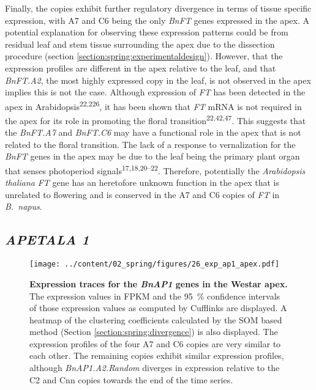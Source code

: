 \documentclass[12pt,]{book}
\begin{document}
Finally, the copies exhibit further regulatory divergence in terms of
tissue specific expression, with A7 and C6 being the only \emph{BnFT}
genes expressed in the apex. A potential explanation for observing these
expression patterns could be from residual leaf and stem tissue
surrounding the apex due to the dissection procedure (section
\ref{section:spring:experimentaldesign}). However, that the expression
profiles are different in the apex relative to the leaf, and that
\emph{BnFT.A2}, the most highly expressed copy in the leaf, is not
observed in the apex implies this is not the case. Although expression
of \emph{FT} has been detected in the apex in
Arabidopsis\textsuperscript{22,226}, it has been shown that \emph{FT}
mRNA is not required in the apex for its role in promoting the floral
transition\textsuperscript{22,42,47}. This suggests that the
\emph{BnFT.A7} and \emph{BnFT.C6} may have a functional role in the apex
that is not related to the floral transition. The lack of a response to
vernalization for the \emph{BnFT} genes in the apex may be due to the
leaf being the primary plant organ that senses photoperiod
signals\textsuperscript{17,18,20--22}. Therefore, potentially the
\emph{Arabidopsis thaliana} \emph{FT} gene has an heretofore unknown
function in the apex that is unrelated to flowering and is conserved in
the A7 and C6 copies of \emph{FT} in \emph{B.~napus}.

\subsection{\texorpdfstring{\emph{APETALA
1}}{APETALA 1}}\label{section:spring:ap1}

\begin{figure}[htbp]
\centering
\texttt{[image: ../content/02\_spring/figures/26\_exp\_ap1\_apex.pdf]}
\caption{\textbf{Expression traces for the \emph{BnAP1} genes in the
Westar apex.} The expression values in FPKM and the 95~\% confidence
intervals of those expression values as computed by Cufflinks are
displayed. A heatmap of the clustering coefficients calculated by the
SOM based method (Section \ref{section:spring:divergence}) is also
displayed. The expression profiles of the four A7 and C6 copies are very
similar to each other. The remaining copies exhibit similar expression
profiles, although \emph{BnAP1.A2.Random} diverges in expression
relative to the C2 and Cnn copies towards the end of the time
series.}\label{figure:226:ap1apex}
\end{figure}
\end{document}
